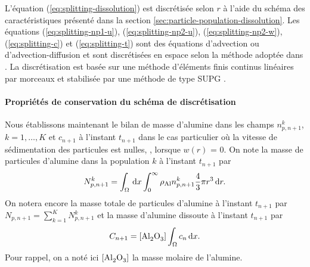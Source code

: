 L'équation (\ref{eq:splitting-dissolution}) est discrétisée selon $r$ à
l'aide du schéma des caractéristiques présenté dans la section
\ref{sec:particle-population-dissolution}. Les équations
(\ref{eq:splitting-np1-u}), (\ref{eq:splitting-np2-u}),
(\ref{eq:splitting-np2-w}), (\ref{eq:splitting-c}) et
(\ref{eq:splitting-t}) sont des équations d'advection ou
d'advection-diffusion et sont discrétisées en espace selon la méthode
adoptée dans \cite{Hofer2011}. La discrétisation est basée sur une
méthode d'éléments finis continus linéaires par morceaux et stabilisée
par une méthode de type SUPG \cite{Quarteroni2008}.

\paragraph{Propriétés de conservation du schéma de discrétisation}
Nous établissons maintenant le bilan de masse d'alumine dans les
champs $n_{p,n+1}^k$, $k = 1,\dots, K$ et $c_{n+1}$ à l'instant
$t_{n+1}$ dans le cas particulier où la vitesse de sédimentation des
particules est nulles, \ie, lorsque $w(r)$ = 0. On note la masse
de particules d'alumine dans la population $k$ à l'instant $t_{n+1}$ par
\begin{equation}\label{eq:np-masse-def}
  N_{p,n+1}^k = \int_\Omega \,\mathrm dx\int_0^\infty \rho_\mathrm{Al}
  n_{p,n+1}^k\frac{4}{3}\pi r^3\,\mathrm dr.
\end{equation}
On notera encore la masse totale de particules d'alumine à l'instant
$t_{n+1}$ par $N_{p,n+1} =
\sum_{k = 1}^K N_{p,n+1}^k$ et la masse d'alumine dissoute à l'instant
$t_{n+1}$ par
\begin{equation}\label{eq:c-masse-def}
  C_{n+1} = [\cee{Al2O3}]\int_\Omega c_n\intd{x}.
\end{equation}
Pour rappel, on a noté ici $[\ce{Al2O3}]$ la masse molaire de l'alumine.

